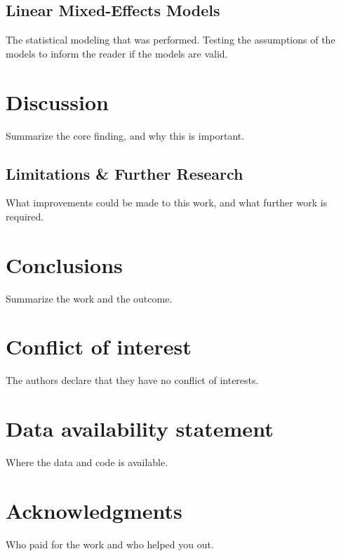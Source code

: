 \documentclass[a4paper,11pt]{article}
\begin{document}
\subsection{Linear Mixed-Effects Models}
The statistical modeling that was performed.
Testing the assumptions of the models to inform the reader if the models are valid.
\section{Discussion}
Summarize the core finding, and why this is important.
\subsection{Limitations \& Further Research}
What improvements could be made to this work, and what further work is required.
\section{Conclusions}
Summarize the work and the outcome.
\section{Conflict of interest}
The authors declare that they have no conflict of interests.
\section{Data availability statement}
Where the data and code is available.
\section{Acknowledgments}
Who paid for the work and who helped you out.


\end{document}
